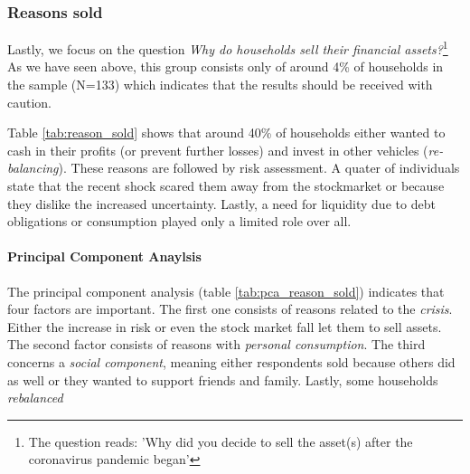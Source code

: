 \documentclass[ProjectABM]{subfiles}
\begin{document}
\subsubsection{Reasons sold}
Lastly, we focus on the question \textit{Why do households sell their financial assets?}\footnote{The question reads: 'Why did you decide to sell the asset(s) after the coronavirus pandemic began'} As we have seen above, this group consists only of around 4\% of households in the sample (N=133) which indicates that the results should be received with caution.



Table \ref{tab:reason_sold} shows that around 40\% of households either wanted to cash in their profits (or prevent further losses) and invest in other vehicles (\textit{re-balancing}). These reasons are followed by risk assessment. A quater of individuals state that the recent shock scared them away from the stockmarket or because they dislike the increased uncertainty. Lastly, a need for liquidity due to debt obligations or consumption played only a limited role over all. %

\paragraph{Principal Component Anaylsis}
The principal component analysis (table \ref{tab:pca_reason_sold}) indicates that four factors are important. The first one consists of reasons related to the \textit{crisis}. Either the increase in risk or even the stock market fall let them to sell assets. The second factor consists of reasons with \textit{personal consumption}. The third concerns a \textit{social component}, meaning either respondents sold because others did as well or they wanted to support friends and family. Lastly, some households \textit{rebalanced}
\end{document}
